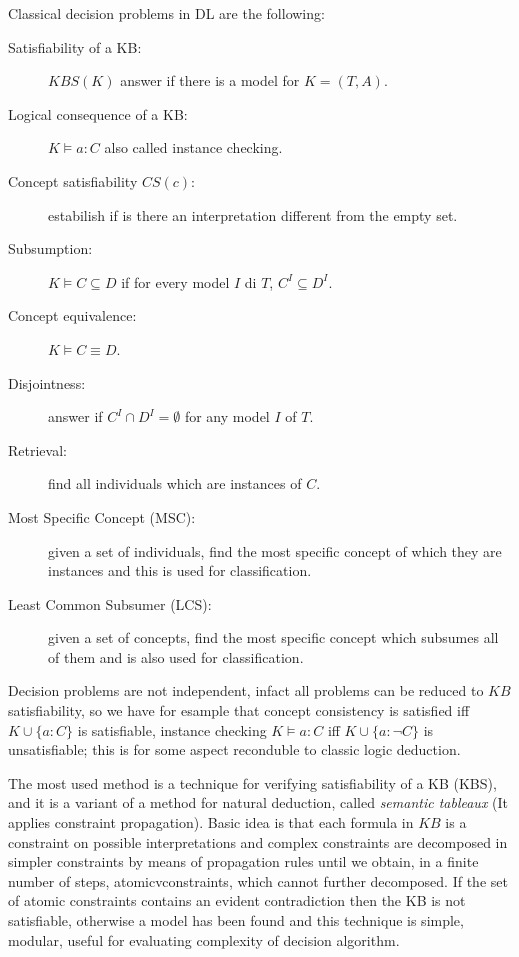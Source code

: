 Classical decision problems in DL are the following:
\begin{description}
   \item [Satisfiability of a KB:]  $KBS(K)$ answer if there is a model for $K = (T, A)$.
   \item [Logical consequence of a KB: ] $K \models a:C$ also called instance checking.
   \item [Concept satisfiability $CS(c)$:] estabilish if is there an interpretation
	   different from the empty set.
   \item [Subsumption: ] $K \models C \subseteq D$ if for every model $I$ di $T$,
	   $C^I \subseteq D^I$.
   \item [Concept equivalence:] $K \models C \equiv D$.
   \item [Disjointness: ] answer if $C^I \cap D^I = \emptyset$ for any model $I$ of $T$.
   \item [Retrieval: ] find all individuals which are instances of $C$.
   \item [Most Specific Concept (MSC): ] given a set of individuals, find the most
	  specific concept of which they are instances and this is used for classification.
   \item [Least Common Subsumer (LCS): ] given a set of concepts, find the most specific
	 concept which subsumes all of them and is also used for classification.
\end{description}
Decision problems are not independent, infact all problems can be reduced to $KB$ 
satisfiability, so we have for esample that concept consistency is satisfied iff 
$K \cup \{a:C\}$ is satisfiable, instance checking $K \models a:C$ iff $K \cup \{a:\neg C\}$
is unsatisfiable; this is for some aspect reconduble to classic logic deduction.

The most used method is a technique for verifying satisfiability of a KB (KBS), and it is
a variant of a method for natural deduction, called \emph{semantic tableaux}
(It applies constraint propagation).\newline
Basic idea is that each formula in $KB$ is a constraint on possible interpretations and 
complex constraints are decomposed in simpler constraints by means of propagation rules
until we obtain, in a finite number of steps, atomicvconstraints,
which cannot further decomposed.\newline
If the set of atomic constraints contains an evident contradiction then the KB is
not satisfiable, otherwise a model has been found and this technique is simple,
modular, useful for evaluating complexity of decision algorithm.

